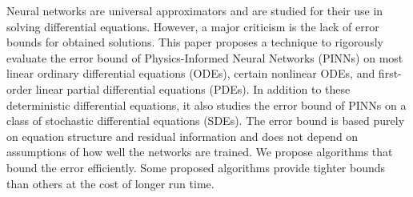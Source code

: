 
Neural networks are universal approximators and are studied for their use in solving differential equations.
However, a major criticism is the lack of error bounds for obtained solutions.
This paper proposes a technique to rigorously evaluate the error bound of Physics-Informed Neural Networks (PINNs) on most linear ordinary differential equations (ODEs), certain nonlinear ODEs, and first-order linear partial differential equations (PDEs).
In addition to these deterministic differential equations, it also studies the error bound of PINNs on a class of stochastic differential equations (SDEs).
The error bound is based purely on equation structure and residual information and does not depend on assumptions of how well the networks are trained.
We propose algorithms that bound the error efficiently. 
Some proposed algorithms provide tighter bounds than others at the cost of longer run time.